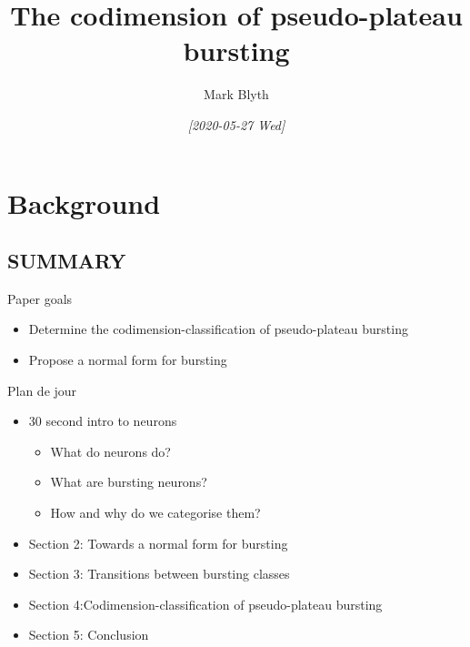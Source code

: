 \documentclass[presentation]{beamer}
\author{Mark Blyth}
\date{\textit{[2020-05-27 Wed]}}
\title{The codimension of pseudo-plateau bursting}
\begin{document}
\maketitle

\section{Background}
\label{sec:org008afe7}
\subsection{SUMMARY}
\label{sec:org5c584bc}
\begin{frame}[label={sec:org503af10}]{Paper goals}
\begin{itemize}
\item Determine the codimension-classification of pseudo-plateau bursting
\item Propose a normal form for bursting
\end{itemize}
\vfill
\end{frame}

\begin{frame}[label={sec:org2a0ea87}]{Plan de jour}
\begin{itemize}
\item \alert{30 second intro to neurons}
\begin{itemize}
\item \alert{What do neurons do?}
\item \alert{What are bursting neurons?}
\item \alert{How and why do we categorise them?}
\end{itemize}
\item Section 2: Towards a normal form for bursting
\item Section 3: Transitions between bursting classes
\item Section 4:Codimension-classification of pseudo-plateau bursting
\item Section 5: Conclusion
\end{itemize}
\end{frame}
\end{document}
